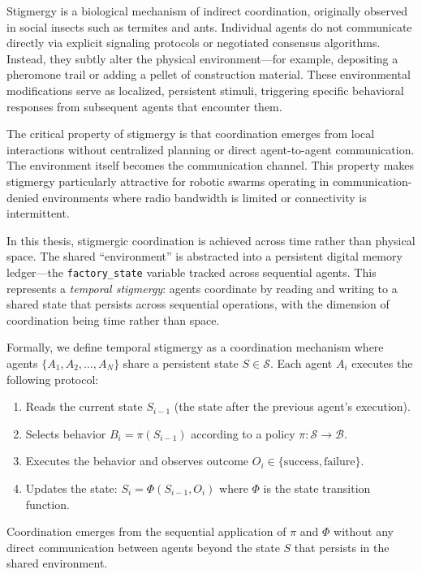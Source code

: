 \documentclass[12pt,a4paper,oneside]{report}
\begin{document}
Stigmergy is a biological mechanism of indirect coordination, originally observed in social insects such as termites and ants. Individual agents do not communicate directly via explicit signaling protocols or negotiated consensus algorithms. Instead, they subtly alter the physical environment---for example, depositing a pheromone trail or adding a pellet of construction material. These environmental modifications serve as localized, persistent stimuli, triggering specific behavioral responses from subsequent agents that encounter them.

The critical property of stigmergy is that coordination emerges from local interactions without centralized planning or direct agent-to-agent communication. The environment itself becomes the communication channel. This property makes stigmergy particularly attractive for robotic swarms operating in communication-denied environments where radio bandwidth is limited or connectivity is intermittent.

In this thesis, stigmergic coordination is achieved across time rather than physical space. The shared ``environment'' is abstracted into a persistent digital memory ledger---the \texttt{factory\_state} variable tracked across sequential agents. This represents a \textit{temporal stigmergy}: agents coordinate by reading and writing to a shared state that persists across sequential operations, with the dimension of coordination being time rather than space.

Formally, we define temporal stigmergy as a coordination mechanism where agents $\{A_1, A_2, \ldots, A_N\}$ share a persistent state $S \in \mathcal{S}$. Each agent $A_i$ executes the following protocol:

\begin{enumerate}
    \item Reads the current state $S_{i-1}$ (the state after the previous agent's execution).
    \item Selects behavior $B_i = \pi(S_{i-1})$ according to a policy $\pi: \mathcal{S} \rightarrow \mathcal{B}$.
    \item Executes the behavior and observes outcome $O_i \in \{\text{success}, \text{failure}\}$.
    \item Updates the state: $S_i = \Phi(S_{i-1}, O_i)$ where $\Phi$ is the state transition function.
\end{enumerate}

Coordination emerges from the sequential application of $\pi$ and $\Phi$ without any direct communication between agents beyond the state $S$ that persists in the shared environment.
\end{document}
